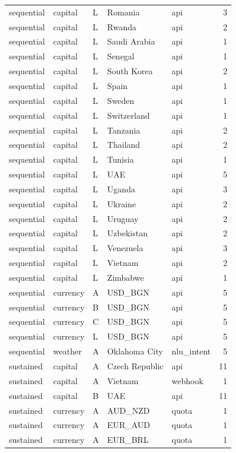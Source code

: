 \begin{tabular}{lllllr}
sequential & capital & L & Romania & api & 3 \\
sequential & capital & L & Rwanda & api & 2 \\
sequential & capital & L & Saudi Arabia & api & 1 \\
sequential & capital & L & Senegal & api & 1 \\
sequential & capital & L & South Korea & api & 2 \\
sequential & capital & L & Spain & api & 1 \\
sequential & capital & L & Sweden & api & 1 \\
sequential & capital & L & Switzerland & api & 1 \\
sequential & capital & L & Tanzania & api & 2 \\
sequential & capital & L & Thailand & api & 2 \\
sequential & capital & L & Tunisia & api & 1 \\
sequential & capital & L & UAE & api & 5 \\
sequential & capital & L & Uganda & api & 3 \\
sequential & capital & L & Ukraine & api & 2 \\
sequential & capital & L & Uruguay & api & 2 \\
sequential & capital & L & Uzbekistan & api & 2 \\
sequential & capital & L & Venezuela & api & 3 \\
sequential & capital & L & Vietnam & api & 2 \\
sequential & capital & L & Zimbabwe & api & 1 \\
sequential & currency & A & USD_BGN & api & 5 \\
sequential & currency & B & USD_BGN & api & 5 \\
sequential & currency & C & USD_BGN & api & 5 \\
sequential & currency & L & USD_BGN & api & 5 \\
sequential & weather & A & Oklahoma City & nlu_intent & 5 \\
sustained & capital & A & Czech Republic & api & 11 \\
sustained & capital & A & Vietnam & webhook & 1 \\
sustained & capital & B & UAE & api & 11 \\
sustained & currency & A & AUD_NZD & quota & 1 \\
sustained & currency & A & EUR_AUD & quota & 1 \\
sustained & currency & A & EUR_BRL & quota & 1 \\

\end{tabular}
